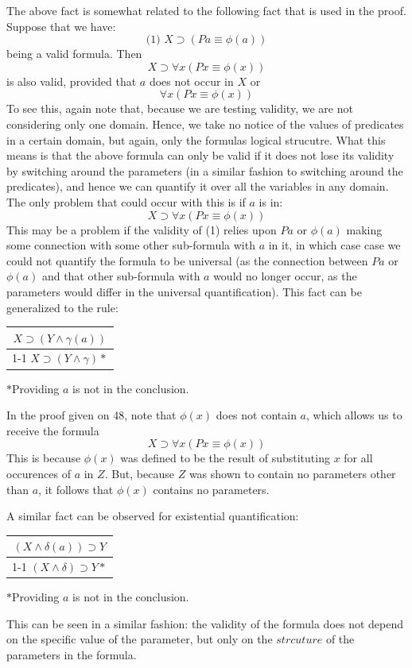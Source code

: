 \documentclass{article}
\theoremstyle{definition}
\begin{document}
The above fact is somewhat related to the following fact that is used in the proof. Suppose that we have:
\[ \textrm{(1) } X\supset\left(Pa\equiv\phi\left(a\right)\right) \] being a valid formula. Then
\[ X\supset\forall x\left(Px\equiv\phi\left(x\right)\right) \] is also valid, provided that $a$ does not occur in $X$ or 
\[ \forall x\left(Px\equiv\phi\left(x\right)\right) \] To see this, again note that, because we are testing validity, we are not considering only one domain. 
Hence, we take no notice of the values of predicates in a certain domain, but again, only the formulas logical strucutre. What this means is that 
the above formula can only be valid if it does not lose its validity by switching around the parameters (in a similar fashion to switching around the 
predicates), and hence we can quantify it over all the variables in any domain. The only problem that could occur with this is if $a$ is in:
\[ X\supset\forall x\left(Px\equiv\phi\left(x\right)\right) \] 
This may be a problem if the validity of (1) relies upon $Pa$ or $\phi(a)$ making some connection with 
some other sub-formula with $a$ in it, in which case case we could not quantify the formula to be universal (as the connection between $Pa$ or $\phi(a)$ 
and that other sub-formula with $a$ would no longer occur, as the parameters would differ in the universal quantification). This fact can be generalized 
to the rule:
\begin{center}
\begin{tabular}{c}
	$X\supset \left(Y\wedge\gamma\left(a\right)\right)$ \\
	\cline{1-1}
	$X\supset \left(Y\wedge\gamma\right)*$
\end{tabular}
\end{center}
\begin{flushright}
$*$Providing $a$ is not in the conclusion.
\end{flushright}
In the proof given on 48, note that $\phi\left(x\right)$ does not contain $a$, which allows us to receive the formula 
\[ X\supset\forall x\left(Px\equiv\phi\left(x\right)\right) \] This is because $\phi(x)$ was defined to be the result of substituting $x$ for all occurences 
of $a$ in $Z$. But, because $Z$ was shown to contain no parameters other than $a$, it follows that $\phi(x)$ contains no parameters.

A similar fact can be observed for existential quantification:
\begin{center}
\begin{tabular}{c}
        $\left(X\wedge \delta\left(a\right)\right)\supset Y$ \\
        \cline{1-1}
        $\left(X\wedge\delta\right)\supset Y*$
\end{tabular}
\end{center}
\begin{flushright}
$*$Providing $a$ is not in the conclusion.
\end{flushright}
This can be seen in a similar fashion: the validity of the formula does not depend on the specific value of the parameter, but only on the 
$strcuture$ of the parameters in the formula.
\end{document}
